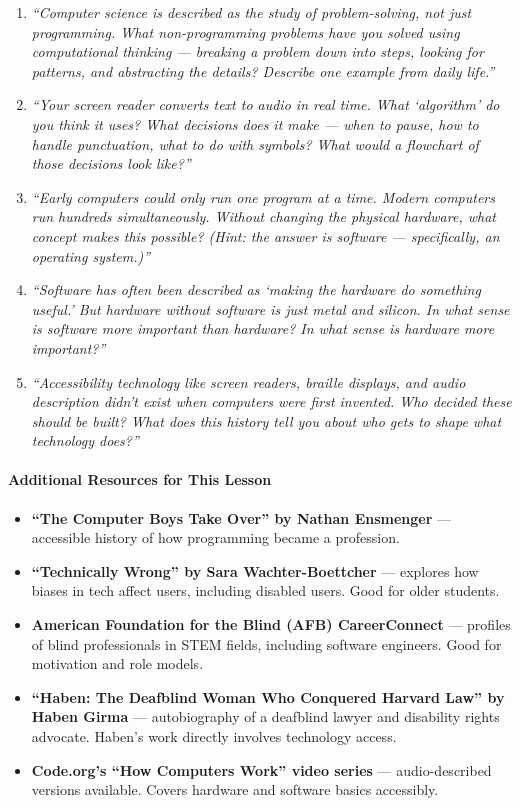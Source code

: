 \documentclass[
  justified,
  openright,
]{tufte-book}
\let\paragraph\paragraph
\let\paragraph\paragraph
\providecommand{\tightlist}{%
  \setlength{\itemsep}{0pt}\setlength{\parskip}{0pt}}
\begin{document}
\begin{enumerate}
\def\labelenumi{\arabic{enumi}.}
\item
  \emph{``Computer science is described as the study of problem-solving,
  not just programming. What non-programming problems have you solved
  using computational thinking --- breaking a problem down into steps,
  looking for patterns, and abstracting the details? Describe one
  example from daily life.''}
\item
  \emph{``Your screen reader converts text to audio in real time. What
  `algorithm' do you think it uses? What decisions does it make --- when
  to pause, how to handle punctuation, what to do with symbols? What
  would a flowchart of those decisions look like?''}
\item
  \emph{``Early computers could only run one program at a time. Modern
  computers run hundreds simultaneously. Without changing the physical
  hardware, what concept makes this possible? (Hint: the answer is
  software --- specifically, an operating system.)''}
\item
  \emph{``Software has often been described as `making the hardware do
  something useful.' But hardware without software is just metal and
  silicon. In what sense is software more important than hardware? In
  what sense is hardware more important?''}
\item
  \emph{``Accessibility technology like screen readers, braille
  displays, and audio description didn't exist when computers were first
  invented. Who decided these should be built? What does this history
  tell you about who gets to shape what technology does?''}
\end{enumerate}

\paragraph{Additional Resources for This
Lesson}\label{additional-resources-for-this-lesson}

\begin{itemize}
\tightlist
\item
  \textbf{``The Computer Boys Take Over'' by Nathan Ensmenger} ---
  accessible history of how programming became a profession.
\item
  \textbf{``Technically Wrong'' by Sara Wachter-Boettcher} --- explores
  how biases in tech affect users, including disabled users. Good for
  older students.
\item
  \textbf{American Foundation for the Blind (AFB) CareerConnect} ---
  profiles of blind professionals in STEM fields, including software
  engineers. Good for motivation and role models.
\item
  \textbf{``Haben: The Deafblind Woman Who Conquered Harvard Law'' by
  Haben Girma} --- autobiography of a deafblind lawyer and disability
  rights advocate. Haben's work directly involves technology access.
\item
  \textbf{Code.org's ``How Computers Work'' video series} ---
  audio-described versions available. Covers hardware and software
  basics accessibly.
\end{itemize}
\end{document}
